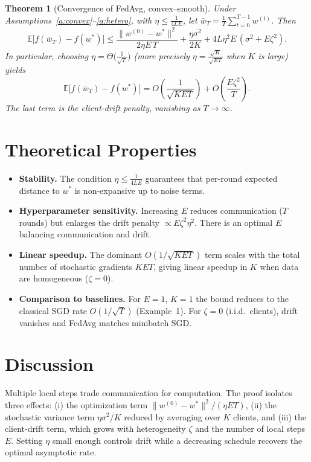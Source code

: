 \documentclass[11pt]{article}
\newtheorem{theorem}{Theorem}
\begin{document}
\begin{theorem}[Convergence of FedAvg, convex--smooth]\label{thm:main}
Under Assumptions~\ref{a:convex}--\ref{a:hetero}, with
$\eta \le \frac{1}{4LE}$, let $\bar w_T = \frac{1}{T}\sum_{t=0}^{T-1} w^{(t)}$.
Then
\[
\mathbb{E}\big[ f(\bar w_T) - f(w^*) \big]
\le
\frac{\|w^{(0)} - w^*\|^2}{2\eta E\, T}
+ \frac{\eta \sigma^2}{2K}
+ 4 L \eta^2 E\,(\sigma^2 + E\zeta^2).
\]
In particular, choosing $\eta = \Theta\!\Big(\frac{1}{\sqrt{T}}\Big)$
(more precisely $\eta = \frac{\sqrt{K}}{\sqrt{ET}}$ when $K$ is large) yields
\[
\mathbb{E}\big[ f(\bar w_T) - f(w^*) \big]
= O\!\left( \frac{1}{\sqrt{KET}} \right)
+ O\!\left( \frac{E\zeta^2}{T} \right).
\]
The last term is the \emph{client-drift penalty}, vanishing as $T\to\infty$.
\end{theorem}

\section*{Theoretical Properties}

\begin{itemize}
  \item \textbf{Stability.} The condition $\eta \le \frac{1}{4LE}$ guarantees that
  per-round expected distance to $w^*$ is non-expansive up to noise terms.
  \item \textbf{Hyperparameter sensitivity.} Increasing $E$ reduces communication
  ($T$ rounds) but enlarges the drift penalty $\propto E\zeta^2 \eta^2$. There is an
  optimal $E$ balancing communication and drift.
  \item \textbf{Linear speedup.} The dominant $O(1/\sqrt{KET})$ term scales with the
  total number of stochastic gradients $KET$, giving linear speedup in $K$ when data
  are homogeneous ($\zeta=0$).
  \item \textbf{Comparison to baselines.} For $E=1$, $K=1$ the bound reduces to the
  classical SGD rate $O(1/\sqrt{T})$ (Example~1). For $\zeta=0$ (i.i.d.\ clients),
  drift vanishes and FedAvg matches minibatch SGD.
\end{itemize}

\section*{Discussion}

Multiple local steps trade communication for computation. The proof isolates three
effects: (i) the optimization term $\|w^{(0)}-w^*\|^2/(\eta E T)$, (ii) the stochastic
variance term $\eta\sigma^2/K$ reduced by averaging over $K$ clients, and
(iii) the client-drift term, which grows with heterogeneity $\zeta$ and the number of
local steps $E$. Setting $\eta$ small enough controls drift while a decreasing schedule
recovers the optimal asymptotic rate.
\end{document}
